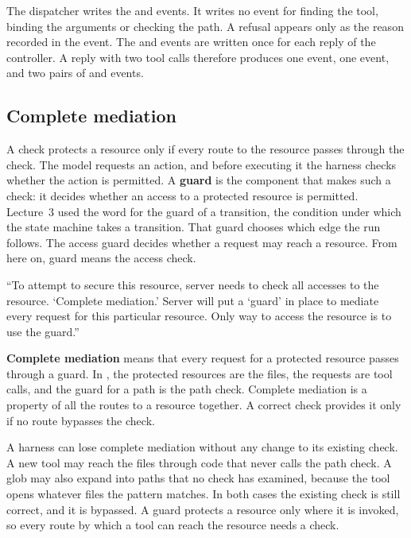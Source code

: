 The dispatcher writes the  and  events. It
writes no event for finding the tool, binding the arguments or checking the path. A refusal appears
only as the reason recorded in the  event. The  and
 events are written once for each reply of the controller. A reply with two tool calls
therefore produces one  event, one  event, and two pairs of
 and  events.

\subsection{Complete mediation}
\label{sec:dispatcher-mediation}

A check protects a resource only if every route to the resource passes through the check. The model
requests an action, and before executing it the harness checks whether the action is permitted. A
\textbf{guard} is the component that makes such a check: it decides whether an access to a protected
resource is permitted. Lecture~3 used the word for the guard of a transition, the condition under
which the state machine takes a transition. That guard chooses which edge the run follows. The
access guard decides whether a request may reach a resource. From here on, guard means the access
check.

\begin{definition}
\label{def:dispatcher-mediation}
``To attempt to secure this resource, server needs to check all accesses to the resource.
`Complete mediation.' Server will put a `guard' in place to mediate every request for this
particular resource. Only way to access the resource is to use the guard.''~\citep{mit6033-lec20}
\end{definition}

\textbf{Complete mediation} means that every request for a protected resource passes
through a guard. In \msa{}, the protected resources are the files, the requests are tool calls, and
the guard for a path is the path check. Complete mediation is a property of all the routes to a
resource together. A correct check provides it only if no route bypasses the check.

A harness can lose complete mediation without any change to its existing check. A new tool may reach
the files through code that never calls the path check. A glob may also expand into paths that no
check has examined, because the tool opens whatever files the pattern matches. In both cases the
existing check is still correct, and it is bypassed. A guard protects a resource only where it is
invoked, so every route by which a tool can reach the resource needs a check.

